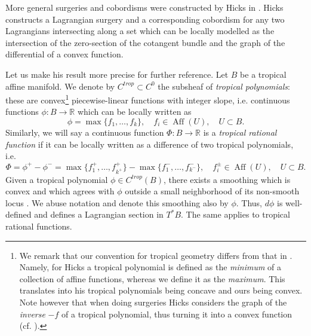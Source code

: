 \documentclass[10pt]{amsart}
\theoremstyle{definition}
\theoremstyle{remark}
\def\R{\mathbb{R}}
\DeclareMathOperator{\Aff}{Aff}
\begin{document}
More general surgeries and cobordisms were constructed by Hicks in \cite{hicks2019tropical, hicks2020tropical}.
Hicks constructs a Lagrangian surgery and a corresponding cobordism for any two Lagrangians intersecting along a set which can be locally modelled as the intersection of the zero-section of the cotangent bundle and the graph of the differential of a convex function. 

Let us make his result more precise for further reference.
Let $B$ be a tropical affine manifold.
We denote by $C^{trop} \subset C^0$ the subsheaf of \emph{tropical polynomials}: these are convex\footnote{We remark that our convention for tropical geometry differs from that in \cite{hicks2020tropical}. Namely, for Hicks a tropical polynomial is defined as the \emph{minimum} of a collection of affine functions, whereas we define it as the \emph{maximum}. This translates into his tropical polynomials being concave and ours being convex. Note however that when doing surgeries Hicks considers the graph of the \emph{inverse} $-f$ of a tropical polynomial, thus turning it into a convex function (cf. \cite[Definition 3.15]{hicks2020tropical}).} piecewise-linear functions  with integer slope, i.e. continuous functions $\phi: B \to \R$ which can be locally written as
\begin{equation}\label{eq:tropicalpolynomial}
    \phi = \max \{f_1,\dots,f_k\},\quad f_i \in \Aff(U), \quad  U \subset B.
\end{equation}
Similarly, we will say a continuous function $\Phi: B \to \R$ is a \emph{tropical rational function} if it can be locally written as a difference of two tropical polynomials, i.e.
$$
\Phi = \phi^+ - \phi^- = \max \{f^+_1,\dots,f^+_{k^+}\} - \max \{f^-_1,\dots,f^-_{k^-}\},\quad f^\pm_i \in \Aff(U), \quad  U \subset B.
$$
Given a tropical polynomial $\phi \in C^{trop}(B)$, there exists a smoothing which is convex and which agrees with $\phi$ outside a small neighborhood of its non-smooth locus \cite[Section 3.2]{hicks2020tropical}.
We abuse notation and denote this smoothing also by $\phi$.
Thus, $d\phi$ is well-defined and defines a Lagrangian section in $T^*B$.
The same applies to tropical rational functions.
\end{document}
